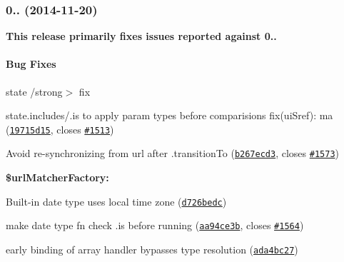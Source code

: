 {\bfseries {\bfseries {\bfseries \label{_0.2.13}%
 \subsubsection*{0.. (2014-\/11-\/20)}}}}

{\bfseries {\bfseries {\bfseries }}}

{\bfseries {\bfseries {\bfseries This release primarily fixes issues reported against 0..}}}

{\bfseries {\bfseries {\bfseries \paragraph*{Bug Fixes}}}}

{\bfseries {\bfseries {\bfseries }}}

{\bfseries {\bfseries {\bfseries 
\begin{DoxyItemize}
\item {\bfseries \begin{DoxyParagraph}{state}
/strong$>$ fix 
\end{DoxyParagraph}
state.\+includes/.is to apply param types before comparisions fix(ui\+Sref)\+: ma (\href{https://github.com/angular-ui/ui-router/commit/19715d15e3cbfff724519e9febedd05b49c75baa}{\tt 19715d15}, closes \href{https://github.com/angular-ui/ui-router/issues/1513}{\tt \#1513})
\begin{DoxyItemize}
\item Avoid re-\/synchronizing from url after .transition\+To (\href{https://github.com/angular-ui/ui-router/commit/b267ecd348e5c415233573ef95ebdbd051875f52}{\tt b267ecd3}, closes \href{https://github.com/angular-ui/ui-router/issues/1573}{\tt \#1573})
\end{DoxyItemize}}
\item {\bfseries {\bfseries \$url\+Matcher\+Factory\+:}
\begin{DoxyItemize}
\item Built-\/in date type uses local time zone (\href{https://github.com/angular-ui/ui-router/commit/d726bedcbb5f70a5660addf43fd52ec730790293}{\tt d726bedc})
\item make date type fn check .is before running (\href{https://github.com/angular-ui/ui-router/commit/aa94ce3b86632ad05301530a2213099da73a3dc0}{\tt aa94ce3b}, closes \href{https://github.com/angular-ui/ui-router/issues/1564}{\tt \#1564})
\item early binding of array handler bypasses type resolution (\href{https://github.com/angular-ui/ui-router/commit/ada4bc27df5eff3ba3ab0de94a09bd91b0f7a28c}{\tt ada4bc27})

\end{DoxyItemize}}
\end{DoxyItemize}}}}

